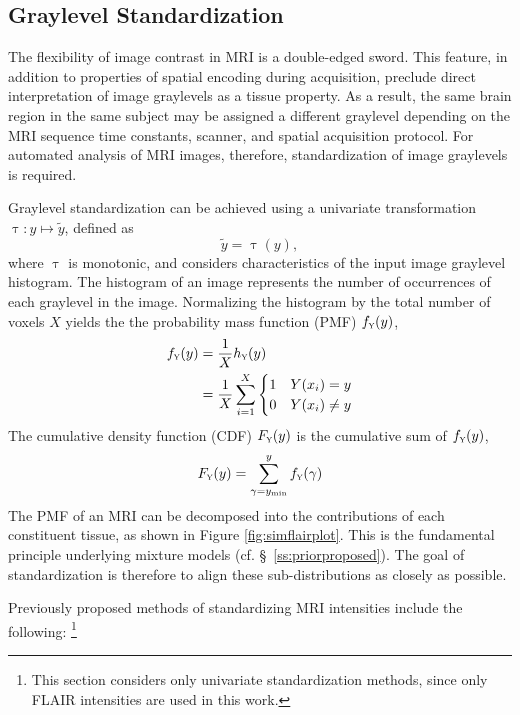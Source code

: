 \subsection{Graylevel Standardization}\label{ss:meth-ystd}
The flexibility of image contrast in MRI is a double-edged sword.
This feature, in addition to properties of spatial encoding during acquisition, preclude direct interpretation of image graylevels as a tissue property.
As a result, the same brain region in the same subject may be assigned a different graylevel depending on the MRI sequence time constants, scanner, and spatial acquisition protocol.
For automated analysis of MRI images, therefore, standardization of image graylevels is required.
\par
Graylevel standardization can be achieved using a univariate transformation $\uptau:y\mapsto\tilde{y}$, defined as
\begin{equation}
\tilde{y} = \uptau(y),
\end{equation}
where $\uptau$ is monotonic, and considers characteristics of the input image graylevel histogram.
The histogram of an image represents the number of occurrences of each graylevel in the image.
Normalizing the histogram by the total number of voxels $X$ yields the the probability mass function (PMF) $f_{\textsc{y}}(y)$,
\begin{align}
f_{\textsc{y}}(y) &= \frac{1}{X}h_{\textsc{y}}(y)\nonumber\\
&= \frac{1}{X}\sum_{i=1}^{X}
\begin{cases}
1&Y(x_i) = y\\
0&Y(x_i) \ne y\\
\end{cases}
\end{align}
The cumulative density function (CDF) $F_{\textsc{y}}(y)$ is the cumulative sum of $f_{\textsc{y}}(y)$,
\begin{equation}
F_{\textsc{y}}(y) = \sum_{\gamma=y_{\min}}^{y} f_{\textsc{y}}(\gamma)
\end{equation}
The PMF of an MRI can be decomposed into the contributions of each constituent tissue, as shown in Figure \ref{fig:simflairplot}.
This is the fundamental principle underlying mixture models (cf. \S\ \ref{ss:priorproposed}).
The goal of standardization is therefore to align these sub-distributions as closely as possible.
\par
Previously proposed methods of standardizing MRI intensities include the following:%
\footnote{This section considers only univariate standardization methods, since only FLAIR intensities are used in this work.}
